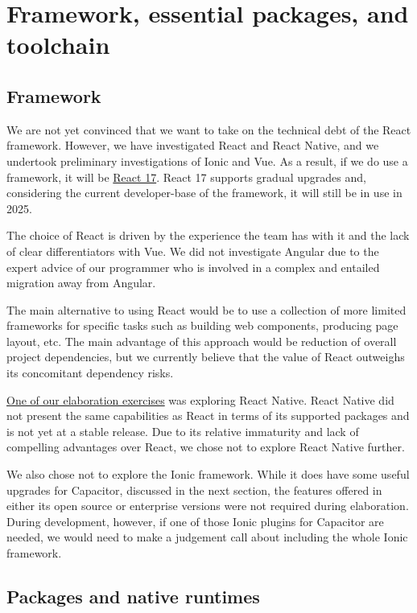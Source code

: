 \documentclass[a4paper,headings=small fontsize=10pt]{scrreprt}
\begin{document}
\section{Framework, essential packages, and
toolchain}

\subsection{Framework}

We are not yet convinced that we want to take on the technical debt of
the React framework. However, we have investigated React and React
Native, and we undertook preliminary investigations of Ionic and Vue. As
a result, if we do use a framework, it will be
\href{https://reactjs.org/docs/faq-versioning.html}{{React 17}}. React
17 supports gradual upgrades and, considering the current developer-base
of the framework, it will still be in use in 2025.

The choice of React is driven by the experience the team has with it and
the lack of clear differentiators with Vue. We did not investigate
Angular due to the expert advice of our programmer who is involved in a
complex and entailed migration away from Angular.

The main alternative to using React would be to use a collection of more
limited frameworks for specific tasks such as building web components,
producing page layout, etc. The main advantage of this approach would be
reduction of overall project dependencies, but we currently believe that
the value of React outweighs its concomitant dependency risks.

\href{https://github.com/FAIMS/faims3reactnative}{{One of our
elaboration exercises}} was exploring React Native. React Native did not
present the same capabilities as React in terms of its supported
packages and is not yet at a stable release. Due to its relative
immaturity and lack of compelling advantages over React, we chose not to
explore React Native further.

We also chose not to explore the Ionic framework. While it does have
some useful upgrades for Capacitor, discussed in the next section, the
features offered in either its open source or enterprise versions were
not required during elaboration. During development, however, if one of
those Ionic plugins for Capacitor are needed, we would need to make a
judgement call about including the whole Ionic framework.

\subsection{Packages and native
runtimes}
\end{document}
